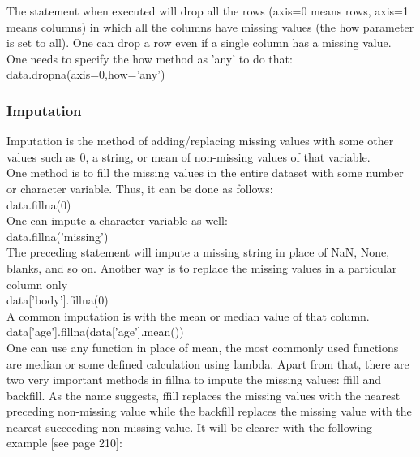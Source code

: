 \documentclass{article}
\numberwithin{equation}{section} %
\begin{document}
The statement when executed will drop all the rows (axis=0 means rows, axis=1
means columns) in which all the columns have missing values (the how parameter
is set to all). One can drop a row even if a single column has a missing value. One
needs to specify the how method as 'any' to do that: \\

data.dropna(axis=0,how='any') \\

\subsubsection*{Imputation}

Imputation is the method of adding/replacing missing values with some other
values such as 0, a string, or mean of non-missing values of that variable. \\

One method is to fill the missing values in the entire dataset with some number or
character variable. Thus, it can be done as follows: \\

data.fillna(0) \\

One can impute a character variable as well: \\

data.fillna('missing') \\

The preceding statement will impute a missing string in place of NaN, None, blanks,
and so on. Another way is to replace the missing values in a particular column only \\

data['body'].fillna(0) \\

A common imputation is with the mean or median value of that column. \\

data['age'].fillna(data['age'].mean()) \\

One can use any function in place of mean, the most commonly used functions
are median or some defined calculation using lambda. Apart from that, there are
two very important methods in fillna to impute the missing values: ffill and
backfill. As the name suggests, ffill replaces the missing values with the nearest
preceding non-missing value while the backfill replaces the missing value with the
nearest succeeding non-missing value. It will be clearer with the following example [see page 210]: \\
\end{document}
